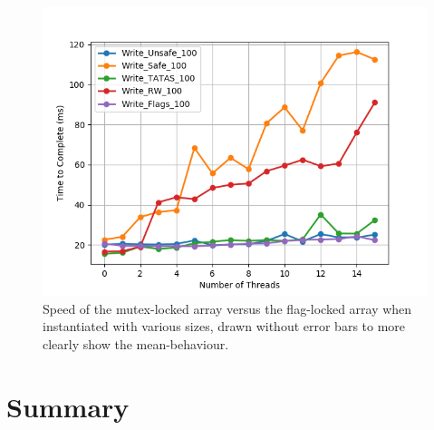 \documentclass[11pt]{article}
\begin{document}
\begin{figure}\label{fig:step7_4}
\centering
\includegraphics[scale=0.65]{step7_4.png}
\caption{Speed of the mutex-locked array versus the flag-locked array when instantiated with various sizes, drawn without error bars to more clearly show the mean-behaviour.}
\end{figure}




\section{Summary}
\end{document}

